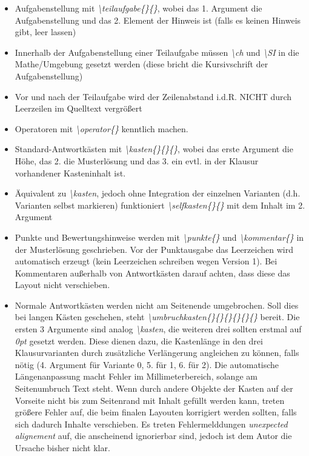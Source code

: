 \documentclass[./main.tex]{subfiles}
\begin{document}
\begin{itemize}
    \item Aufgabenstellung mit \textit{\textbackslash teilaufgabe\{\}\{\}}, wobei das 1. Argument die Aufgabenstellung und das 2. Element der Hinweis ist (falls es keinen Hinweis gibt, leer lassen)
    \item Innerhalb der Aufgabenstellung einer Teilaufgabe m\"ussen \textit{\textbackslash ch} und \hypertarget{SI}{\textit{\textbackslash SI}} in die Mathe\-/Umgebung gesetzt werden (diese bricht die Kursivschrift der Aufgabenstellung)
    \item Vor und nach der Teilaufgabe wird der Zeilenabstand i.d.R. NICHT durch Leerzeilen im Quelltext vergr\"o\ss{}ert
    \item Operatoren mit \textit{\hypertarget{operator}{\textbackslash operator\{\}}} kenntlich machen. 
    \item Standard-Antwortk\"asten mit \textit{\hypertarget{kasten}{\textbackslash kasten\{\}\{\}\{\}}}, wobei das erste Argument die H\"ohe, das 2. die Musterl\"osung und das 3. ein evtl. in der Klausur vorhandener Kasteninhalt ist. 
    \item \"Aquivalent zu \textit{\textbackslash kasten}, jedoch ohne Integration der einzelnen Varianten (d.h. Varianten selbst markieren) funktioniert \textit{\hypertarget{selfkasten}{\textbackslash selfkasten\{\}\{\}}} mit dem Inhalt im 2. Argument
    \item Punkte und Bewertungshinweise werden mit \hypertarget{punkte}{\textit{\textbackslash punkte\{\}}} und \hypertarget{kommentar}{\textit{\textbackslash kommentar\{\}}} in der Musterl\"osung geschrieben. Vor der Punktausgabe das Leerzeichen wird automatisch erzeugt (kein Leerzeichen schreiben wegen Version 1). Bei Kommentaren au\ss{}erhalb von Antwortk\"asten darauf achten, dass diese das Layout nicht verschieben.
    \item Normale Antwortk\"asten werden nicht am Seitenende umgebrochen. Soll dies bei langen K\"asten geschehen, steht \hypertarget{umbruchkasten}{\textit{\textbackslash umbruchkasten\{\}\{\}\{\}\{\}\{\}\{\}}} bereit. Die ersten 3 Argumente sind analog \textit{\textbackslash kasten}, die weiteren drei sollten erstmal auf \textit{0pt} gesetzt werden. Diese dienen dazu, die Kastenl\"ange in den drei Klausurvarianten durch zus\"atzliche Verl\"angerung angleichen zu k\"onnen, falls n\"otig (4. Argument f\"ur Variante 0, 5. f\"ur 1, 6. f\"ur 2). Die automatische L\"angenanpassung macht Fehler im Millimeterbereich, solange am Seitenumbruch Text steht. Wenn durch andere Objekte der Kasten auf der Vorseite nicht bis zum Seitenrand mit Inhalt gef\"ullt werden kann, treten gr\"o\ss{}ere Fehler auf, die beim finalen Layouten korrigiert werden sollten, falls sich dadurch Inhalte verschieben. Es treten Fehlermelddungen \textit{unexpected alignement} auf, die anscheinend ignorierbar sind, jedoch ist dem Autor die Ursache bisher nicht klar. 

\end{itemize}
\end{document}
